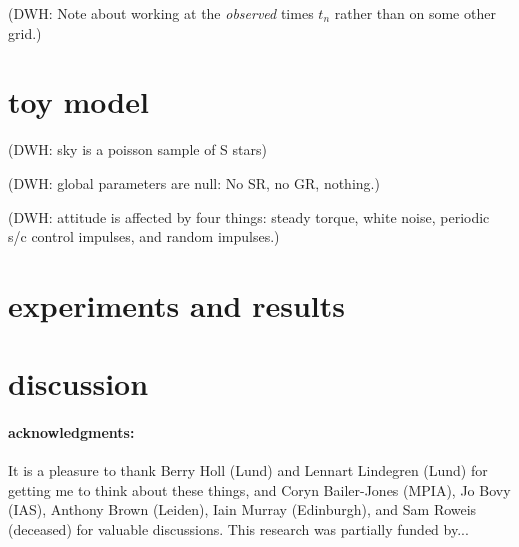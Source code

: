 \documentclass[12pt]{article}
\begin{document}
(DWH: Note about working at the \emph{observed} times $t_n$ rather
than on some other grid.)

\section{toy model}

(DWH: sky is a poisson sample of S stars)

(DWH: global parameters are null:  No SR, no GR, nothing.)

(DWH: attitude is affected by four things: steady torque, white noise,
periodic s/c control impulses, and random impulses.)

\section{experiments and results}

\section{discussion}

\paragraph{acknowledgments:}
It is a pleasure to thank Berry Holl (Lund) and Lennart Lindegren
(Lund) for getting me to think about these things, and Coryn
Bailer-Jones (MPIA), Jo Bovy (IAS), Anthony Brown (Leiden), Iain
Murray (Edinburgh), and Sam Roweis (deceased) for valuable
discussions.  This research was partially funded by...
\end{document}
